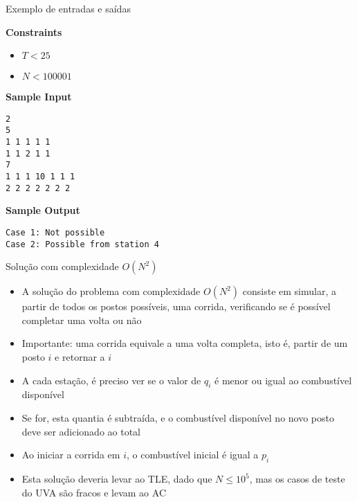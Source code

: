 \begin{frame}[fragile]{Exemplo de entradas e saídas}

\textbf{Constraints}

\begin{itemize}
    \item $T < 25$
    \item $N < 100001$
\end{itemize}

\vspace{0.2in}

\begin{minipage}[t]{0.5\textwidth}
\textbf{Sample Input}
\begin{verbatim}
2
5
1 1 1 1 1
1 1 2 1 1
7
1 1 1 10 1 1 1
2 2 2 2 2 2 2
\end{verbatim}
\end{minipage}
\begin{minipage}[t]{0.45\textwidth}
\textbf{Sample Output}
\begin{verbatim}
Case 1: Not possible
Case 2: Possible from station 4
\end{verbatim}
\end{minipage}
\end{frame}

\begin{frame}[fragile]{Solução com complexidade $O(N^2)$}

    \begin{itemize}
        \item A solução do problema com complexidade $O(N^2)$ consiste em simular, a partir 
            de todos os postos possíveis, uma corrida, verificando se é possível 
            completar uma volta ou não

        \item Importante: uma corrida equivale a uma volta completa, isto é,
            partir de um posto $i$ e retornar a $i$

        \item A cada estação, é preciso ver se o valor de $q_i$ é menor ou igual ao combustível
            disponível

        \item Se for, esta quantia é subtraída, e o combustível disponível no novo posto deve
            ser adicionado ao total

        \item Ao iniciar a corrida em $i$, o combustível inicial é igual a $p_i$

        \item Esta solução deveria levar ao TLE, dado que $N \leq 10^5$, mas os casos de
            teste do UVA são fracos e levam ao AC
   \end{itemize}

\end{frame}

